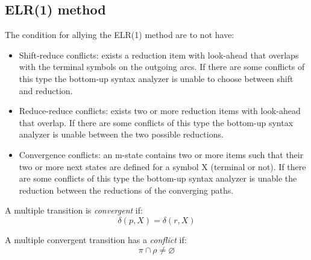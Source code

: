 \subsection*{ELR(1) method}
The condition for allying the ELR(1) method are to not have: 
\begin{itemize}
    \item Shift-reduce conflicts: exists a reduction item with look-ahead that overlaps with the terminal symbols on the outgoing arcs. 
        If there are some conflicts of this type the bottom-up syntax analyzer is unable to choose between shift and reduction. 
    \item Reduce-reduce conflicts: exists two or more reduction items with look-ahead that overlap. 
        If there are some conflicts of this type the bottom-up syntax analyzer is unable between the two possible reductions. 
    \item Convergence conflicts: an m-state contains two or more items such that their two or more next states are defined for a symbol X (terminal or not). 
        If there are some conflicts of this type the bottom-up syntax analyzer is unable the reduction between the reductions of the converging paths. 
\end{itemize}
\begin{definition}
    A multiple transition is \emph{convergent} if: 
    \[\delta(p,X)=\delta(r,X)\]

    A multiple convergent transition has a \emph{conflict} if: 
    \[\pi \cap \rho \neq \varnothing\]
\end{definition}

